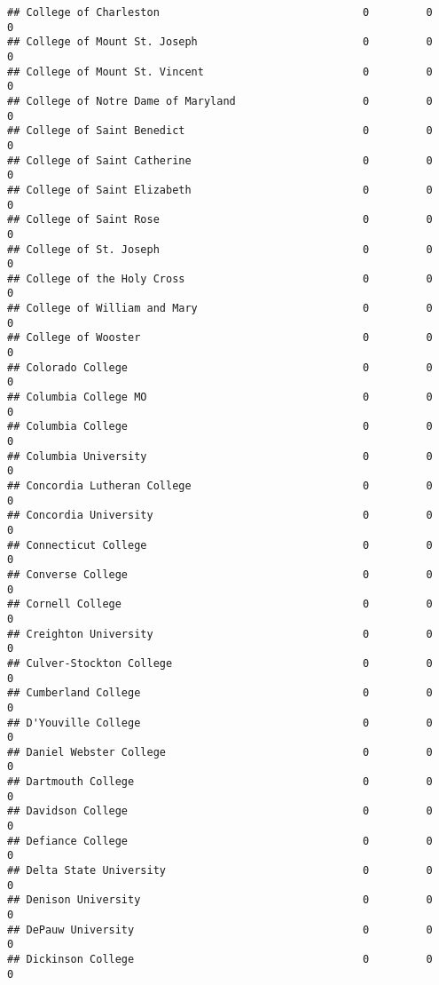 \documentclass[
]{article}
\begin{document}
\begin{verbatim}
## College of Charleston                                0         0           0
## College of Mount St. Joseph                          0         0           0
## College of Mount St. Vincent                         0         0           0
## College of Notre Dame of Maryland                    0         0           0
## College of Saint Benedict                            0         0           0
## College of Saint Catherine                           0         0           0
## College of Saint Elizabeth                           0         0           0
## College of Saint Rose                                0         0           0
## College of St. Joseph                                0         0           0
## College of the Holy Cross                            0         0           0
## College of William and Mary                          0         0           0
## College of Wooster                                   0         0           0
## Colorado College                                     0         0           0
## Columbia College MO                                  0         0           0
## Columbia College                                     0         0           0
## Columbia University                                  0         0           0
## Concordia Lutheran College                           0         0           0
## Concordia University                                 0         0           0
## Connecticut College                                  0         0           0
## Converse College                                     0         0           0
## Cornell College                                      0         0           0
## Creighton University                                 0         0           0
## Culver-Stockton College                              0         0           0
## Cumberland College                                   0         0           0
## D'Youville College                                   0         0           0
## Daniel Webster College                               0         0           0
## Dartmouth College                                    0         0           0
## Davidson College                                     0         0           0
## Defiance College                                     0         0           0
## Delta State University                               0         0           0
## Denison University                                   0         0           0
## DePauw University                                    0         0           0
## Dickinson College                                    0         0           0

\end{verbatim}
\end{document}
